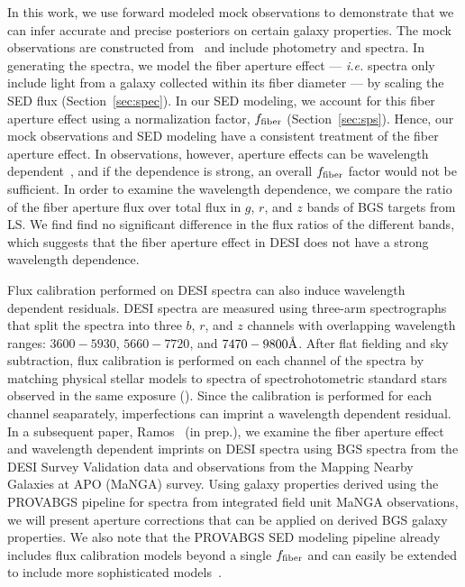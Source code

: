 
In this work, we use forward modeled mock observations to demonstrate that we
can infer accurate and precise posteriors on certain galaxy properties.
The mock observations are constructed from \lgal~and include photometry and
spectra. 
In generating the spectra, we model the fiber aperture effect --- \emph{i.e.}
spectra only include light from a galaxy collected within its fiber diameter 
--- by scaling the SED flux (Section~\ref{sec:spec}).
In our SED modeling, we account for this fiber aperture effect using a
normalization factor, $f_{\rm fiber}$ (Section~\ref{sec:sps}). 
Hence, our mock observations and SED modeling have a consistent treatment of
the fiber aperture effect. 
In observations, however, aperture effects can be wavelength
dependent~\citep{gerssen2012, richards2016}, and if the dependence is strong,
an overall $f_{\rm fiber}$ factor would not be sufficient.
In order to examine the wavelength dependence, we compare the ratio of the
fiber aperture flux over total flux in $g$, $r$, and $z$ bands of BGS targets
from LS.
We find find no significant difference in the flux ratios of the different
bands, which suggests that the fiber aperture effect in DESI does not have a
strong wavelength dependence. 

Flux calibration performed on DESI spectra can also induce wavelength dependent
residuals. 
DESI spectra are measured using three-arm spectrographs that split the spectra
into three $b$, $r$, and $z$ channels with overlapping wavelength ranges: 
$3600 - 5930$, $5660 - 7720$, and $7470 - 9800 \AA$.  
After flat fielding and sky subtraction, flux calibration is performed on each
channel of the spectra by matching physical stellar models to spectra of
spectrohotometric standard stars observed in the same exposure
(). 
Since the calibration is performed for each channel seaparately, imperfections
can imprint a wavelength dependent residual. 
In a subsequent paper, Ramos \etal~(in prep.), we examine the fiber aperture
effect and wavelength dependent imprints on DESI spectra using BGS
spectra from the DESI Survey Validation data and observations from the Mapping
Nearby Galaxies at APO (MaNGA) survey. 
Using galaxy properties derived using the {\sc PROVABGS} pipeline for spectra
from integrated field unit MaNGA observations, we will present aperture
corrections that can be applied on derived BGS galaxy properties. 
We also note that the {\sc PROVABGS} SED modeling pipeline already includes flux
calibration models beyond a single $f_{\rm fiber}$ and can easily be extended
to include more sophisticated models~\citep[\emph{e.g.} Chebyschev
polynomial;][]{carnall2017, tacchella2021}. 

